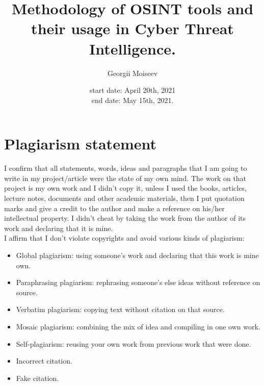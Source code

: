 \documentclass[12pt, letterpaper, twoside]{article}
\title{Methodology of OSINT tools and their usage in Cyber Threat Intelligence.}
\author{Georgii Moiseev }
\date{start date: April 20th, 2021\\ end date: May 15th, 2021.}
\begin{document}
\begin{titlepage}
\maketitle
\end{titlepage}


\newpage



\section{\large Plagiarism statement}
I confirm that all statements, words, ideas and paragraphs that I am going to write in my project/article were the state of my own mind. The work on that project is my own work and I didn't copy it, unless I used the books, articles, lecture notes, documents and other academic materials, then I put quotation marks and give a credit to the author and make a reference on his/her intellectual  property. I didn't cheat by taking the work from the author of its work and declaring that it is mine.\\
\vspace{1mm}
 I affirm that I don't violate copyrights and avoid various kinds of plagiarism:
\begin{itemize}
    \item Global plagiarism: using someone's work and declaring that this work is mine own.
    \item Paraphrasing plagiarism: rephrasing someone's else ideas without reference on source.
    \item Verbatim plagiarism: copying text without citation on that source.
    \item  Mosaic plagiarism: combining the mix of idea and compiling in one own work.
    \item Self-plagiarism: reusing your own work from previous work that were done.
    \item  Incorrect citation.
    \item Fake citation.
\end{itemize}

\newpage
\end{document}
